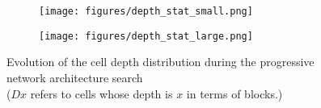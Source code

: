 \documentclass{article}
\begin{document}
\begin{figure}[h!]
	\begin{subfigure}[t]{0.49\textwidth}
	\texttt{[image: figures/depth\_stat\_small.png]}
	\end{subfigure}
	\begin{subfigure}[t]{0.49\textwidth}
	\texttt{[image: figures/depth\_stat\_large.png]}
	\end{subfigure}
        
\caption{Evolution of the cell depth distribution during the progressive network architecture search\\
         ($Dx$ refers to cells whose depth is $x$ in terms of blocks.)}
\label{fig:depth_stats}
\end{figure}
\end{document}

